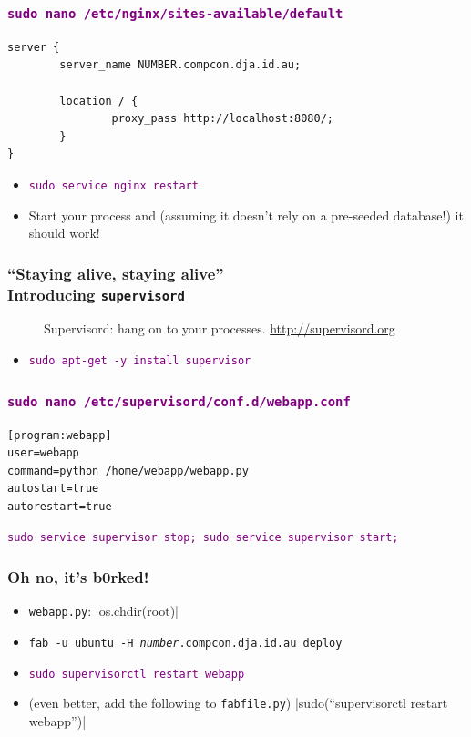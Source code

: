 \documentclass{beamer}
\newcommand\aws[1]{\textcolor{purple}{\texttt{#1}}}
\begin{document}
\begin{frame}[fragile]
  \frametitle{\aws{sudo nano /etc/nginx/sites-available/default}}

\begin{verbatim}
server {
        server_name NUMBER.compcon.dja.id.au;

        location / {
                proxy_pass http://localhost:8080/;
        }
}
\end{verbatim}

  \begin{itemize}
  \item \aws{sudo service nginx restart}
  \item Start your process and (assuming it doesn't rely on a
    pre-seeded database!) it should work!
  \end{itemize}
\end{frame}

\begin{frame}
  \frametitle{``Staying alive, staying alive''\\Introducing
    \texttt{supervisord}}
  \begin{figure}[h!]
    \centering
    \caption{Supervisord: hang on to your processes. \url{http://supervisord.org} }
    \label{fig:supervisord_logo}
  \end{figure}

  \begin{itemize}
  \item \aws{sudo apt-get -y install supervisor}
  \end{itemize}
  
\end{frame}

\begin{frame}[fragile]
  \frametitle{\aws{sudo nano /etc/supervisord/conf.d/webapp.conf}}
\begin{verbatim}
[program:webapp]
user=webapp
command=python /home/webapp/webapp.py
autostart=true
autorestart=true
\end{verbatim}
  \aws{sudo service supervisor stop; sudo service supervisor start;}
\end{frame}

\begin{frame}
  \frametitle{Oh no, it's b0rked!}

  \begin{itemize}
  \item<1-> \texttt{webapp.py}: |os.chdir(root)|
  \item<2-> \texttt{fab -u ubuntu -H \textit{number}.compcon.dja.id.au
      deploy}
  \item<2-> \aws{sudo supervisorctl restart webapp}
  \item<3-> (even better, add the following to \texttt{fabfile.py})
|sudo(``supervisorctl restart webapp'')|
  \end{itemize}
\end{frame}
\end{document}
